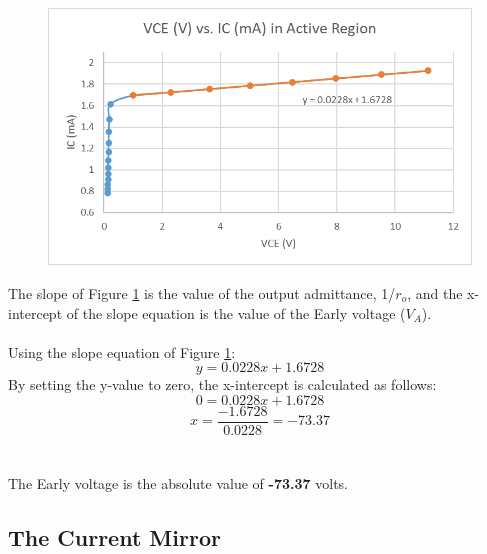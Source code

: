 \documentclass{article}
\begin{document}
	\begin{figure}[!ht]
		\centering
		\includegraphics[width=0.8\linewidth]{vce_vs_ic_slope.png}
		\label{f9}
	\end{figure}
	
	\noindent The slope of Figure \ref{f9} is the value of the output admittance, 1/$r_o$, and the x-intercept of the slope equation is the value of the Early voltage ($V_A$).\\\\
	Using the slope equation of Figure \ref{f9}:
	$$y = 0.0228x + 1.6728$$
	By setting the y-value to zero, the x-intercept is calculated as follows:
	$$0 = 0.0228x + 1.6728$$
	$$x = \frac{-1.6728}{0.0228} = -73.37$$\\\\
	The Early voltage is the absolute value of \textbf{-73.37} volts.
	\pagebreak
	
	\subsection{The Current Mirror}
\end{document}
